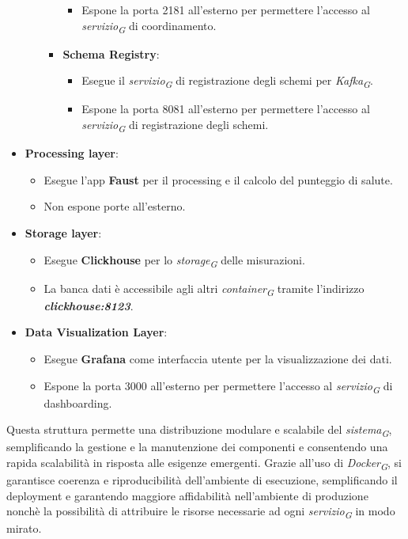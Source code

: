 \begin{itemize}
\begin{itemize}
\begin{itemize}
\begin{itemize}
                    \item Espone la porta 2181 all'esterno per permettere l'accesso al \textit{servizio}\textsubscript{\textit{G}} di coordinamento.
                \end{itemize}
                \item \textbf{Schema Registry}:
                \begin{itemize}
                    \item Esegue il \textit{servizio}\textsubscript{\textit{G}} di registrazione degli schemi per \textit{Kafka}\textsubscript{\textit{G}}.
                    \item Espone la porta 8081 all'esterno per permettere l'accesso al \textit{servizio}\textsubscript{\textit{G}} di registrazione degli schemi.
                \end{itemize}
            \end{itemize}
    \end{itemize} 
    \item \textbf{Processing layer}:
    \begin{itemize}
        \item Esegue l'app \textbf{Faust} per il processing e il calcolo del punteggio di salute.
        \item Non espone porte all'esterno.
    \end{itemize}
    \item \textbf{Storage layer}:
    \begin{itemize}
        \item Esegue \textbf{Clickhouse} per lo \textit{storage}\textsubscript{\textit{G}} delle misurazioni.
        \item La banca dati è accessibile agli altri \textit{container}\textsubscript{\textit{G}} tramite l'indirizzo \textit{\textbf{clickhouse:8123}}.
    \end{itemize}
    \item \textbf{Data Visualization Layer}:
    \begin{itemize}
        \item Esegue \textbf{Grafana} come interfaccia utente per la visualizzazione dei dati.
        \item Espone la porta 3000 all'esterno per permettere l'accesso al \textit{servizio}\textsubscript{\textit{G}} di dashboarding.
    \end{itemize}
\end{itemize}
Questa struttura permette una distribuzione modulare e scalabile del \textit{sistema}\textsubscript{\textit{G}}, semplificando la gestione e la manutenzione dei componenti e consentendo una rapida scalabilità in risposta alle esigenze emergenti. Grazie all'uso di \textit{Docker}\textsubscript{\textit{G}}, si garantisce coerenza e riproducibilità dell'ambiente di esecuzione, semplificando il deployment e garantendo maggiore affidabilità nell'ambiente di produzione nonchè la possibilità di attribuire le risorse necessarie ad ogni \textit{servizio}\textsubscript{\textit{G}} in modo mirato.


